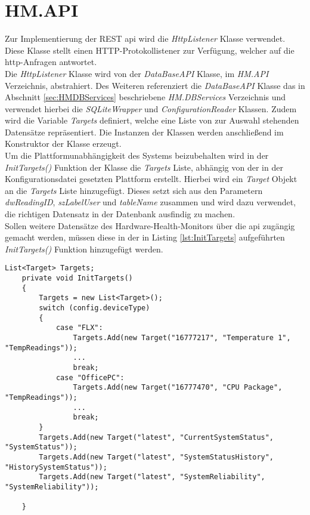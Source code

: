\newpage
\section{HM.API}
Zur Implementierung der REST \ac{api} wird die \textit{HttpListener} Klasse verwendet. Diese Klasse stellt einen HTTP-Protokollistener zur Verfügung, welcher auf die \ac{http}-Anfragen antwortet. \cite{HttpListener}\\
Die \textit{HttpListener} Klasse wird von der \textit{DataBaseAPI} Klasse, im \textit{HM.API} Verzeichnis, abstrahiert. Des Weiteren referenziert die \textit{DataBaseAPI} Klasse das in Abschnitt \ref{sec:HMDBServices} beschriebene \textit{HM.DBServices} Verzeichnis und verwendet hierbei die \textit{SQLiteWrapper} und \textit{ConfigurationReader} Klassen. Zudem wird die Variable \textit{Targets} definiert, welche eine Liste von zur Auswahl stehenden Datensätze repräsentiert. Die Instanzen der Klassen werden anschließend im Konstruktor der Klasse erzeugt.\\
Um die Plattformunabhängigkeit des Systems beizubehalten wird in der \textit{InitTargets()} Funktion der Klasse die \textit{Targets} Liste, abhängig von der in der Konfigurationsdatei gesetzten Plattform erstellt. Hierbei wird ein \textit{Target} Objekt an die \textit{Targets} Liste hinzugefügt. Dieses setzt sich aus den Parametern \textit{dwReadingID}, \textit{szLabelUser} und \textit{tableName} zusammen und wird dazu verwendet, die richtigen Datensatz in der Datenbank ausfindig zu machen.\\
Sollen weitere Datensätze des Hardware-Health-Monitors über die \ac{api} zugängig gemacht werden, müssen diese in der in Listing \ref{lst:InitTargets} aufgeführten \textit{InitTargets()} Funktion hinzugefügt werden. 
\begin{lstlisting}[caption={InitTargets Funktino der DataBaseAPI}, label={lst:InitTargets}]
    List<Target> Targets;
    private void InitTargets()
    {
        Targets = new List<Target>();
        switch (config.deviceType)
        {
            case "FLX":
                Targets.Add(new Target("16777217", "Temperature 1", "TempReadings"));
                ...
                break;
            case "OfficePC":
                Targets.Add(new Target("16777470", "CPU Package", "TempReadings"));
                ...
                break;
        }
        Targets.Add(new Target("latest", "CurrentSystemStatus", "SystemStatus"));
        Targets.Add(new Target("latest", "SystemStatusHistory", "HistorySystemStatus"));
        Targets.Add(new Target("latest", "SystemReliability", "SystemReliability"));

    }
\end{lstlisting}
